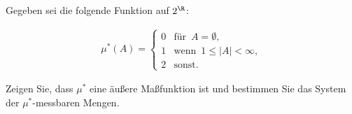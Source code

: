 
\begin{exercise}

Gegeben sei die folgende Funktion auf $2^\R$:

\begin{align*}
  \mu^\ast(A) =
  \begin{cases}
    0 & \text{für} \enspace A = \emptyset, \\
    1 & \text{wenn} \enspace 1 \leq |A| < \infty, \\
    2 & \text{sonst}.
  \end{cases}
\end{align*}

Zeigen Sie, dass $\mu^\ast$ eine äußere Maßfunktion ist und bestimmen Sie das System der $\mu^\ast$-messbaren Mengen.

\end{exercise}


